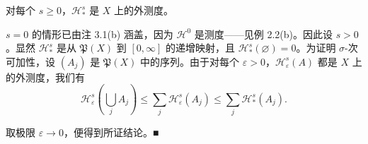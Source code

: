 \begin{proposition}

对每个 $ s \ge 0 $，$ \mathcal{H}_*^s $ 是 $ X $ 上的外测度。

\proofhead
$ s = 0 $ 的情形已由注 3.1(b) 涵盖，因为 $ \mathcal{H}^0 $ 是测度——见例 2.2(b)。因此设 $ s > 0 $。显然 $ \mathcal{H}_*^s $ 是从 $ \mathfrak{P}(X) $ 到 $ [0, \infty] $ 的递增映射，且 $ \mathcal{H}_*^s(\varnothing) = 0 $。为证明 $ \sigma $-次可加性，设 $ (A_j) $ 是 $ \mathfrak{P}(X) $ 中的序列。由于对每个 $ \varepsilon > 0 $，$ \mathcal{H}_\varepsilon^s(A) $ 都是 $ X $ 上的外测度，我们有
\[
\mathcal{H}_\varepsilon^s\left(\bigcup_j A_j\right) \le \sum_j \mathcal{H}_\varepsilon^s(A_j) \le \sum_j \mathcal{H}_*^s(A_j) .
\]

取极限 $ \varepsilon \to 0 $，便得到所证结论。\nobreak\hspace{0.35em}■

\end{proposition}

\exerciseshead

